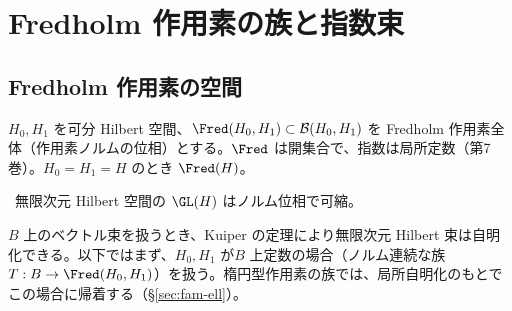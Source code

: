 
\section{Fredholm 作用素の族と指数束}\label{sec:Fred}
\subsection{Fredholm 作用素の空間}
$H_0,H_1$ を可分 Hilbert 空間、$\Fred(H_0,H_1)\subset\mathcal B(H_0,H_1)$ を Fredholm 作用素全体（作用素ノルムの位相）とする。$\Fred$ は開集合で、指数は局所定数（第7巻）。$H_0=H_1=H$ のとき $\Fred(H)$。
\begin{thm}[Kuiper]\label{thm:Kuiper}\tC\
無限次元 Hilbert 空間の $\GL(H)$ はノルム位相で可縮。
\end{thm}
$B$ 上のベクトル束を扱うとき、Kuiper の定理により無限次元 Hilbert 束は自明化できる。以下ではまず、$H_0,H_1$ が$B$ 上定数の場合（ノルム連続な族 $T:B\to\Fred(H_0,H_1)$）を扱う。楕円型作用素の族では、局所自明化のもとでこの場合に帰着する（\S\ref{sec:fam-ell}）。

